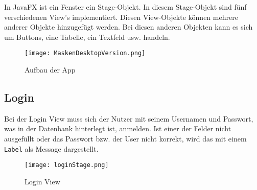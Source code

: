In JavaFX ist ein Fenster ein Stage-Objekt. In diesem Stage-Objekt sind fünf verschiedenen View's implementiert. Diesen View-Objekte können mehrere anderer Objekte hinzugefügt werden. Bei diesen anderen Objekten kann es sich um Buttons, eine Tabelle, ein Textfeld usw. handeln.

\begin{figure}[h]
  \begin{center}
    \texttt{[image: MaskenDesktopVersion.png]}
  		  \caption{Aufbau der App}
     \label{fig.MaskenDesktopVersion}
  \end{center}
\end{figure}\newpage

\subsection{Login}
\label{subsec.login}
Bei der Login View muss sich der Nutzer mit seinem Usernamen und Passwort, was in der Datenbank hinterlegt ist, anmelden. Ist einer der Felder nicht ausgefüllt oder das Passwort bzw. der User nicht korrekt, wird das mit einem \texttt{Label} als Message dargestellt. %
%
\begin{figure}[h]
  \begin{center}
    \texttt{[image: loginStage.png]}
  		  \caption{Login View}
     \label{fig.loginFenster}
  \end{center}
\end{figure}


